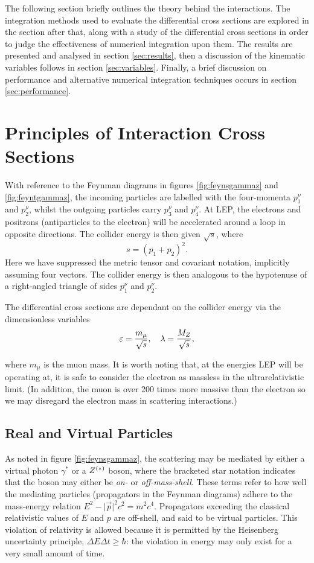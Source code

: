 \documentclass[]{article}
\begin{document}
The following section briefly outlines the theory behind the interactions. The integration methods used to evaluate the differential cross sections are explored in the section after that, along with a study of the differential cross sections in order to judge the effectiveness of numerical integration upon them. The results are presented and analysed in section \ref{sec:results}, then a discussion of the kinematic variables follows in section \ref{sec:variables}. Finally, a brief discussion on performance and alternative numerical integration techniques occurs in section \ref{sec:performance}.

\section{Principles of Interaction Cross Sections}

With reference to the Feynman diagrams in figures \ref{fig:feynsgammaz} and \ref{fig:feyntgammaz}, the incoming particles are labelled with the four-momenta $p_{1}^{\nu}$ and $p_{2}^{\nu}$, whilst the outgoing particles carry $p_{3}^{\nu}$ and $p_{4}^{\nu}$. At LEP, the electrons and positrons (antiparticles to the electron) will be accelerated around a loop in opposite directions. The collider energy is then given $\sqrt{s}$, where $$s = (p_{1} + p_{2})^{2}.$$ Here we have suppressed the metric tensor and covariant notation, implicitly assuming four vectors. The collider energy is then analogous to the hypotenuse of a right-angled triangle of sides $p_{1}^{\nu}$ and $p_{2}^{\nu}$.

The differential cross sections are dependant on the collider energy via the dimensionless variables $$\varepsilon = \frac{m_{\mu}}{\sqrt{s}}, \quad \lambda = \frac{M_{Z }}{\sqrt{s}},$$

where $m_{\mu}$ is the muon mass. It is worth noting that, at the energies LEP will be operating at, it is safe to consider the electron as massless in the ultrarelativistic limit. (In addition, the muon is over 200 times more massive than the electron so we may disregard the electron mass in scattering interactions.)

\subsection{Real and Virtual Particles}

As noted in figure \ref{fig:feynsgammaz}, the scattering may be mediated by either a virtual photon $\gamma^{*}$ or a $Z ^{(*)}$ boson, where the bracketed star notation indicates that the boson may either be \emph{on-} or \emph{off-mass-shell}. These terms refer to how well the mediating particles (propagators in the Feynman diagrams) adhere to the mass-energy relation $E^{2} - \lvert{\vec{p}}\rvert^{2}c^{2} = m^{2}c^{4}$. Propagators exceeding the classical relativistic values of $E$ and $p$ are off-shell, and said to be virtual particles. This violation of relativity is allowed because it is permitted by the Heisenberg uncertainty principle, $\Delta E\Delta t \geq \hbar$: the violation in energy may only exist for a very small amount of time.
\end{document}
